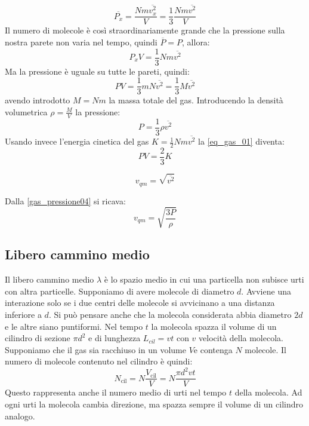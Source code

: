 \begin{equation}
\overline{P_x}=\frac{Nm\overline{v_x^2}}{V}=\frac{1}{3}\frac{Nm\overline{v^2}}{V}
\end{equation}
Il numero di molecole è così straordinariamente grande che la pressione sulla nostra parete non varia nel tempo, quindi $\overline P=P$, allora:
$$P_x V=\frac{1}{3}Nm\overline{v^2}$$
Ma la pressione è uguale su tutte le pareti, quindi:
\begin{equation}
PV=\frac{1}{3}mN\overline {v^2}=\frac{1}{3}M\overline{v^2}
\label{eq_gas_01}
\end{equation}
avendo introdotto $M=Nm$ la massa totale del gas. Introducendo la densità volumetrica $\rho=\frac{M}{V}$ la pressione:
\begin{equation}
P=\frac{1}{3}\rho\overline{v^2}
\label{gas_pressione04}
\end{equation}
Usando invece l'energia cinetica del gas $K=\frac{1}{2}Nm\overline{v^2}$ la \eqref{eq_gas_01} diventa:
\begin{equation}
PV=\frac{2}{3}K
\end{equation}
\begin{Def}
\begin{equation}
v_{qm}=\sqrt{\overline{v^2}}
\end{equation}
\end{Def}
Dalla \eqref{gas_pressione04} si ricava:
\begin{equation}
v_{qm}=\sqrt{\frac{3P}{\rho}}
\end{equation}
\subsection{Libero cammino medio}
\label{libero cammino medio fisica1}
Il libero cammino medio $\lambda$ è lo spazio medio in cui una particella non subisce urti con altra particelle. Supponiamo di avere molecole di diametro $d$. Avviene una interazione solo se i due centri delle molecole si avvicinano a una distanza inferiore a $d$. Si può pensare anche che la molecola considerata abbia diametro $2d$ e le altre siano puntiformi. Nel tempo $t$ la molecola spazza il volume di un cilindro di sezione $\pi d^2$ e di lunghezza $L_{cil}=vt$ con $v$ velocità della molecola. Supponiamo che il gas sia racchiuso in un volume $V$e contenga $N$ molecole. Il numero di molecole contenuto nel cilindro è quindi:
$$N_{\text{cil}}=N\frac{V_{\text{cil}}}{V}=N\frac{\pi d^2vt}{V}$$
Questo rappresenta anche il numero medio di urti nel tempo $t$ della molecola. Ad ogni urti la molecola cambia direzione, ma spazza sempre il volume di un cilindro analogo.

